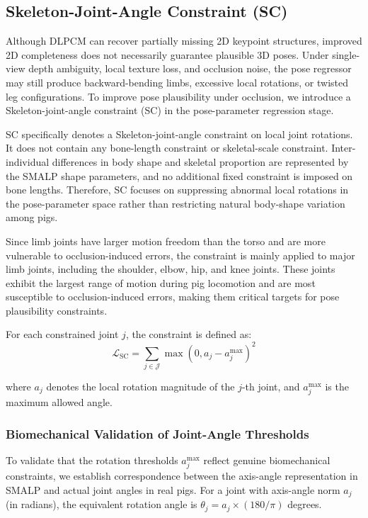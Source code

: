 \documentclass[runningheads]{llncs}
\begin{document}
\subsection{Skeleton-Joint-Angle Constraint (SC)}
\label{subsec:sc}

Although DLPCM can recover partially missing 2D keypoint structures, improved 2D completeness does not necessarily guarantee plausible 3D poses. Under single-view depth ambiguity, local texture loss, and occlusion noise, the pose regressor may still produce backward-bending limbs, excessive local rotations, or twisted leg configurations. To improve pose plausibility under occlusion, we introduce a Skeleton-joint-angle constraint (SC) in the pose-parameter regression stage.

SC specifically denotes a Skeleton-joint-angle constraint on local joint rotations. It does not contain any bone-length constraint or skeletal-scale constraint. Inter-individual differences in body shape and skeletal proportion are represented by the SMALP shape parameters, and no additional fixed constraint is imposed on bone lengths. Therefore, SC focuses on suppressing abnormal local rotations in the pose-parameter space rather than restricting natural body-shape variation among pigs.

Since limb joints have larger motion freedom than the torso and are more vulnerable to occlusion-induced errors, the constraint is mainly applied to major limb joints, including the shoulder, elbow, hip, and knee joints. These joints exhibit the largest range of motion during pig locomotion and are most susceptible to occlusion-induced errors, making them critical targets for pose plausibility constraints.

For each constrained joint $j$, the constraint is defined as:
\begin{equation}
\mathcal{L}_{\text{SC}} = \sum_{j \in \mathcal{J}} \max(0, a_j - a_j^{\max})^2
\label{eq:sc_loss}
\end{equation}

where $a_j$ denotes the local rotation magnitude of the $j$-th joint, and $a_j^{\max}$ is the maximum allowed angle.

\subsubsection{Biomechanical Validation of Joint-Angle Thresholds}

To validate that the rotation thresholds $a_j^{\max}$ reflect genuine biomechanical constraints, we establish correspondence between the axis-angle representation in SMALP and actual joint angles in real pigs. For a joint with axis-angle norm $a_j$ (in radians), the equivalent rotation angle is $\theta_j = a_j \times (180/\pi)$ degrees.
\end{document}
